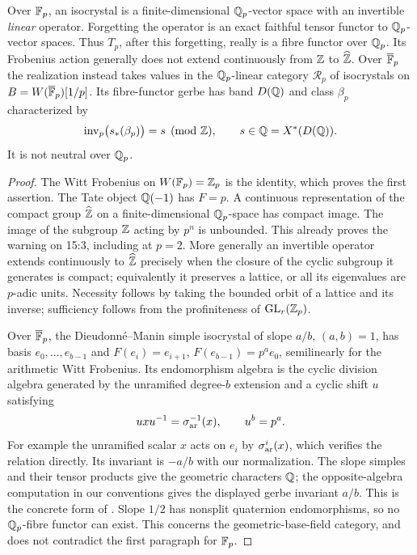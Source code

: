 \begin{theorem}
\label{A:crystalline}
Over $\mathbb F_p$, an isocrystal is a finite-dimensional $\mathbb Q_p$-vector
space with an invertible \emph{linear} operator. Forgetting the
operator is an exact faithful tensor functor to $\mathbb Q_p$-vector
spaces. Thus $T_p$, after this forgetting, really is a fibre functor
over $\mathbb Q_p$. Its Frobenius action generally does not extend
continuously from $\mathbb Z$ to $\widehat{\mathbb Z}$. Over
$\overline{\mathbb F}_p$ the realization instead takes values in the
$\mathbb Q_p$-linear category $\mathcal R_p$ of isocrystals on
$B=W(\overline{\mathbb F}_p)[1/p]$. Its fibre-functor gerbe has band
$D(\mathbb Q)$ and class $\beta_p$ characterized by
\[
 \operatorname{inv}_p\bigl(s_*(\beta_p)\bigr)=s\pmod{\mathbb Z},
 \qquad s\in\mathbb Q=X^*(D(\mathbb Q)).
\]
It is not neutral over $\mathbb Q_p$.
\end{theorem}
\begin{proof}
The Witt Frobenius on $W(\mathbb F_p)=\mathbb Z_p$ is the identity, which proves
the first assertion. The Tate object $\mathbb Q(-1)$ has $F=p$.
A continuous representation of the compact group $\widehat{\mathbb Z}$
on a finite-dimensional $\mathbb Q_p$-space has compact image. The
image of the subgroup $\mathbb Z$ acting by $p^n$ is unbounded. This
already proves the warning on 15:3, including at $p=2$.
More generally an invertible operator extends continuously to
$\widehat{\mathbb Z}$ precisely when the closure of the cyclic subgroup
it generates is compact; equivalently it preserves a lattice, or
all its eigenvalues are $p$-adic units. Necessity follows by taking
the bounded orbit of a lattice and its inverse; sufficiency follows
from the profiniteness of $\mathrm{GL}_r(\mathbb Z_p)$.

Over $\overline{\mathbb F}_p$, the Dieudonn\'e--Manin simple isocrystal
of slope $a/b$, $(a,b)=1$, has basis $e_0,\ldots,e_{b-1}$ and
$F(e_i)=e_{i+1}$, $F(e_{b-1})=p^a e_0$, semilinearly for the
arithmetic Witt Frobenius. Its endomorphism algebra is the cyclic
division algebra generated by the unramified degree-$b$ extension
and a cyclic shift $u$ satisfying
\[
 u x u^{-1}=\sigma_{\rm ar}^{-1}(x),\qquad u^b=p^a.
\]
For example the unramified scalar $x$ acts on $e_i$ by
$\sigma_{\rm ar}^i(x)$, which verifies the relation directly.
Its invariant is $-a/b$ with our normalization. The slope simples
and their tensor products give the geometric characters $\mathbb Q$;
the opposite-algebra computation in our conventions gives the
displayed gerbe invariant $a/b$. This is
the concrete form of \citet[Theorem 2.9, Proposition 2.14, and
Example 3.28]{AMilne1994}. Slope $1/2$ has nonsplit quaternion
endomorphisms, so no $\mathbb Q_p$-fibre functor can exist. This concerns
the geometric-base-field category, and does not contradict the
first paragraph for $\mathbb F_p$.
\end{proof}

